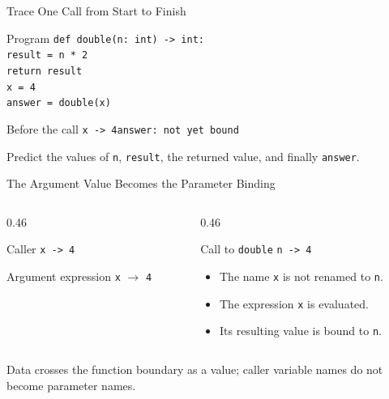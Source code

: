 \documentclass[aspectratio=169,10pt]{beamer}
\begin{document}
\begin{frame}{Trace One Call from Start to Finish}
  \begin{block}{Program}
    \texttt{def double(n: int) -> int:}\\
    \hspace*{0.22in}\texttt{result = n * 2}\\
    \hspace*{0.22in}\texttt{return result}\\[0.08in]
    \texttt{x = 4}\\
    \texttt{answer = double(x)}
  \end{block}

  \begin{block}{Before the call}
    \texttt{x -> 4}\qquad\texttt{answer: not yet bound}
  \end{block}

  \begin{activity}
    Predict the values of \texttt{n}, \texttt{result}, the returned value, and finally \texttt{answer}.
  \end{activity}
\end{frame}

\begin{frame}{The Argument Value Becomes the Parameter Binding}
  \begin{columns}[T,onlytextwidth]
    \begin{column}{0.46\textwidth}
      \begin{block}{Caller}
        \texttt{x -> 4}
      \end{block}

      \begin{block}{Argument expression}
        \texttt{x} $\longrightarrow$ \texttt{4}
      \end{block}
    \end{column}

    \begin{column}{0.46\textwidth}
      \begin{block}{Call to \texttt{double}}
        \texttt{n -> 4}
      \end{block}

      \begin{itemize}
        \item The name \texttt{x} is not renamed to \texttt{n}.
        \item The expression \texttt{x} is evaluated.
        \item Its resulting value is bound to \texttt{n}.
      \end{itemize}
    \end{column}
  \end{columns}

  \begin{keyidea}
    Data crosses the function boundary as a value; caller variable names do not become parameter names.
  \end{keyidea}
\end{frame}
\end{document}
